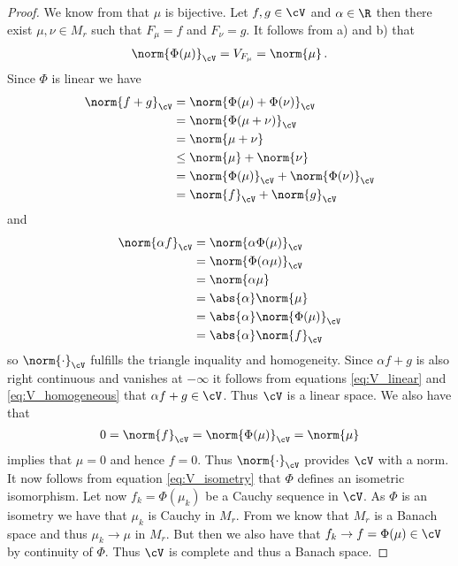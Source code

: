 \begin{proof}
We know from \cite[Proposition 4.4.3]{CohnMT} that $\mu$ is bijective. Let $f,g\in\cV$ and $\alpha\in\R$ then there exist $\mu,\nu\in M_r$ such that $F_\mu=f$ and $F_\nu=g$. It follows from a) and b) that 
\begin{align}
	\norm{\Phi(\mu)}_\cV=V_{F_\mu}=\norm{\mu}\,. \label{eq:V_isometry}
\end{align}
Since $\Phi$ is linear we have
\begin{align}
	\begin{aligned}
	\norm{ f+g}_\cV
	&= \norm{ \Phi(\mu)+\Phi(\nu)}_\cV \\
	&= \norm{ \Phi(\mu+\nu)}_\cV \\
	&= \norm{\mu+\nu}  \\
	&\leq \norm{\mu}+\norm{\nu}  \\
	&= \norm{\Phi(\mu)}_\cV+\norm{\Phi(\nu)}_\cV \\
	&= \norm{f}_\cV+\norm{g}_\cV
	\end{aligned}
	\label{eq:V_linear}
\end{align}
and
\begin{align}
	\begin{aligned}
	\norm{\alpha f}_\cV
	&= \norm{\alpha \Phi(\mu)}_\cV \\
	&= \norm{ \Phi(\alpha\mu)}_\cV \\
	&= \norm{\alpha\mu}  \\
	&= \abs{\alpha}\norm{\mu}  \\
	&= \abs{\alpha}\norm{\Phi(\mu)}_\cV \\
	&= \abs{\alpha}\norm{f}_\cV
	\end{aligned}
	\label{eq:V_homogeneous}
\end{align}
so $\norm{\cdot}_\cV$ fulfills the triangle inquality and homogeneity. Since $\alpha f+g$ is also right continuous and vanishes at $-\infty$ it follows from equations \ref{eq:V_linear} and \ref{eq:V_homogeneous} that $\alpha f+g\in\cV$. Thus $\cV$ is a linear space. We also have that
\begin{align*}
	0=\norm{f}_\cV=\norm{\Phi(\mu)}_\cV=\norm{\mu}
\end{align*}
implies that $\mu=0$ and hence $f=0$. Thus $\norm{\cdot}_\cV$ provides $\cV$ with a norm. 
It now follows from equation \ref{eq:V_isometry} that $\Phi$ defines an isometric isomorphism. Let now $f_k=\Phi(\mu_k)$ be a Cauchy sequence in $\cV$. As $\Phi$ is an isometry we have that $\mu_k$ is Cauchy in $M_r$. From \cite[chapter 7.3]{CohnMT} we know that $M_r$ is a Banach space and thus $\mu_k\to \mu$ in $M_r$. But then we also have that $f_k\to f=\Phi(\mu)\in\cV$ by continuity of $\Phi$. Thus $\cV$ is complete and thus a Banach space.

\end{proof}
